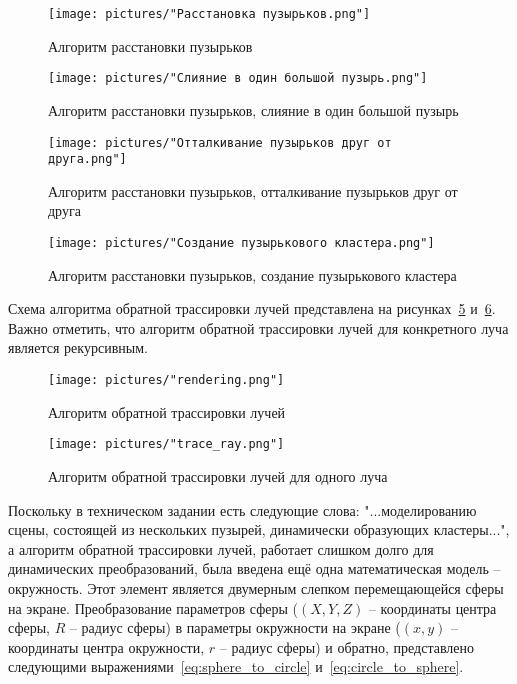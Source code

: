 \begin{figure}[h]
	\centering
	\texttt{[image: pictures/"Расстановка пузырьков.png"]}
	\caption{Алгоритм расстановки пузырьков}
	\label{fig:bubble_positioning}
\end{figure}
\begin{figure}[h]
	\centering
	\texttt{[image: pictures/"Слияние в один большой пузырь.png"]}
	\caption{Алгоритм расстановки пузырьков, слияние в один большой пузырь }
	\label{fig:merge_bubbles}
\end{figure}
\begin{figure}[h]
	\centering
	\texttt{[image: pictures/"Отталкивание пузырьков друг от друга.png"]}
	\caption{Алгоритм расстановки пузырьков, отталкивание пузырьков друг от друга}
	\label{fig:push_bubbles_apart}
\end{figure}
\begin{figure}[h]
	\centering
	\texttt{[image: pictures/"Создание пузырькового кластера.png"]}
	\caption{Алгоритм расстановки пузырьков, создание пузырькового кластера}
	\label{fig:create_bubble_cluster}
\end{figure}
\clearpage
Схема алгоритма обратной трассировки лучей представлена на рисунках~\ref{fig:rendering} и~\ref{fig:trace_ray}. Важно отметить, что алгоритм обратной трассировки лучей для конкретного луча является рекурсивным.
\begin{figure}[h]
	\centering
	\texttt{[image: pictures/"rendering.png"]}
	\caption{Алгоритм обратной трассировки лучей}
	\label{fig:rendering}
\end{figure}
\begin{figure}[h]
	\centering
	\texttt{[image: pictures/"trace\_ray.png"]}
	\caption{Алгоритм обратной трассировки лучей для одного луча}
	\label{fig:trace_ray}
\end{figure}
\clearpage
Поскольку в техническом задании есть следующие слова: "...моделированию сцены, состоящей из нескольких пузырей, динамически образующих кластеры...", а алгоритм обратной трассировки лучей, работает слишком долго для динамических преобразований, была введена ещё одна математическая модель -- окружность. Этот элемент является двумерным слепком перемещающейся сферы на экране.  Преобразование параметров сферы ($(X, Y, Z)$ -- координаты центра сферы, $R$ -- радиус сферы) в параметры окружности на экране ($(x, y)$ -- координаты центра окружности, $r$ -- радиус сферы) и обратно, представлено следующими выражениями~\ref{eq:sphere_to_circle} и~\ref{eq:circle_to_sphere}.
